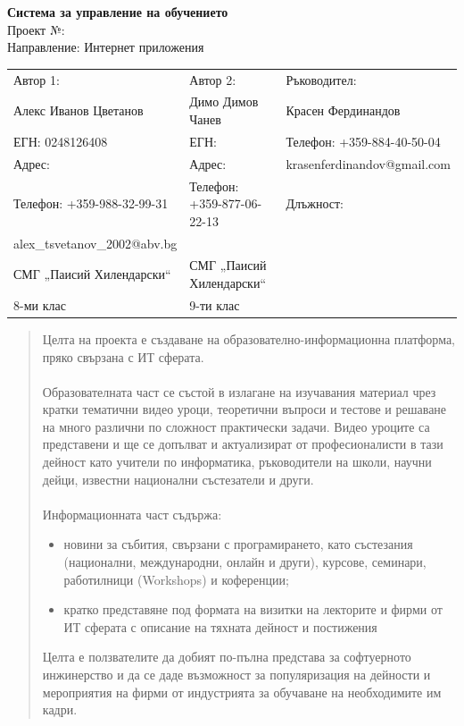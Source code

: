 \documentclass[12pt]{article}
\begin{document}
	\begin{center}
	\end{center}
	\vspace{1.5cm}
	\begin{center}
		\LARGE{\textbf{Система за управление на обучението}}\\\vspace{1.5cm}
		\Large{Проект №:}\\\vspace{1.5cm}
		\large{Направление: Интернет приложения}\\ \vspace{9.25cm}
		\begin{table}[ht]
			\centering
			\resizebox{\textwidth}{!}
			{
				\begin{tabular}{lll}
					Автор 1: & Автор 2: & Ръководител:\\
					Алекс Иванов Цветанов & Димо Димов Чанев & Красен Фердинандов\\
					ЕГН: 0248126408 & ЕГН: & Телефон: +359-884-40-50-04\\
					Адрес: &Адрес: &krasenferdinandov@gmail.com\\
					Телефон: +359-988-32-99-31& Телефон: +359-877-06-22-13 & Длъжност:\\
					alex\_tsvetanov\_2002@abv.bg& &\\
					СМГ „Паисий Хилендарски“&СМГ „Паисий Хилендарски“ &\\
					8-ми клас&9-ти клас &\\
				\end{tabular}
			}
		\end{table}
	\end{center}
	
	\newpage
	\tableofcontents
	\newpage
	\begin{abstract}
		Целта на проекта е създаване на образователно-информационна платформа, пряко свързана с ИТ сферата.\\\\
		Образователната част се състой в излагане на изучавания материал чрез кратки тематични видео уроци, теоретични въпроси и тестове и решаване на много различни по сложност практически задачи. Видео уроците са представени и ще се допълват и актуализират от професионалисти в тази дейност като учители по информатика, ръководители на школи, научни дейци, известни национални състезатели и други.\\\\
		Информационната част съдържа:
		\begin{itemize}
			\item новини за събития, свързани с програмирането, като състезания (национални, международни, онлайн и други), курсове, семинари, работилници (Workshops) и коференции; 
			\item кратко представяне под формата на визитки на лекторите и фирми от ИТ сферата с описание на тяхната дейност и постижения
		\end{itemize}
		
		Целта е ползвателите да добият по-пълна представа за софтуерното инжинерство и да се даде възможност за популяризация на дейности и мероприятия на фирми от индустрията за обучаване на необходимите им кадри.
	\end{abstract}
	\newpage
\end{document}
